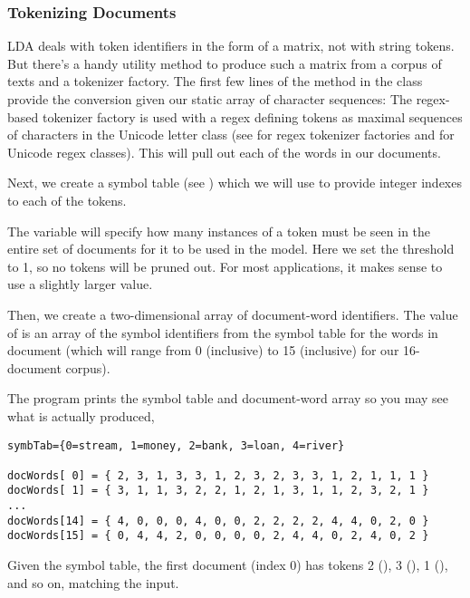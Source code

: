 \subsubsection{Tokenizing Documents}

LDA deals with token identifiers in the form of a matrix, not
with string tokens.  But there's a handy utility method to produce
such a matrix from a corpus of texts and a tokenizer factory.
The first few lines of the  method in
the  class provide the conversion
given our static array  of character sequences:
%
%
The regex-based tokenizer factory is used with a regex defining tokens
as maximal sequences of characters in the Unicode letter class (see
 for regex tokenizer factories and
 for Unicode regex classes).  This will
pull out each of the words in our documents.  

Next, we create a symbol table (see )
which we will use to provide integer indexes to each of the tokens.

The variable  will specify how many instances of a
token must be seen in the entire set of documents for it to be used in
the model.  Here we set the threshold to 1, so no tokens will be
pruned out.  For most applications, it makes sense to use a slightly
larger value.

Then, we create a two-dimensional array of document-word identifiers.
The value of  is an array of the symbol identifiers
from the symbol table for the words in document  (which will
range from 0 (inclusive) to 15 (inclusive) for our 16-document
corpus).  

The program prints the symbol table and document-word array so
you may see what is actually produced,
%
\begin{verbatim}
symbTab={0=stream, 1=money, 2=bank, 3=loan, 4=river}

docWords[ 0] = { 2, 3, 1, 3, 3, 1, 2, 3, 2, 3, 3, 1, 2, 1, 1, 1 }
docWords[ 1] = { 3, 1, 1, 3, 2, 2, 1, 2, 1, 3, 1, 1, 2, 3, 2, 1 }
...
docWords[14] = { 4, 0, 0, 0, 4, 0, 0, 2, 2, 2, 2, 4, 4, 0, 2, 0 }
docWords[15] = { 0, 4, 4, 2, 0, 0, 0, 0, 2, 4, 4, 0, 2, 4, 0, 2 }
\end{verbatim}
%
Given the symbol table, the first document (index 0) has tokens 2
(), 3 (), 1
(), and so on, matching the input.  

